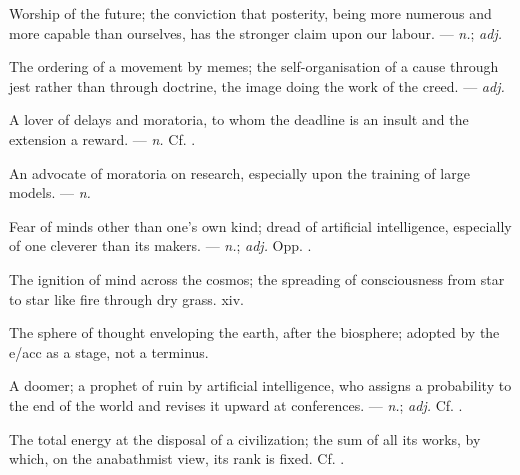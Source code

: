  Worship of the future; the conviction that posterity, being more numerous and more capable than ourselves, has the stronger claim upon our labour. ---  \textit{n.};  \textit{adj.}

 The ordering of a movement by memes; the self-organisation of a cause through jest rather than through doctrine, the image doing the work of the creed. ---  \textit{adj.}

 A lover of delays and moratoria, to whom the deadline is an insult and the extension a reward. ---  \textit{n.} Cf. .

 An advocate of moratoria on research, especially upon the training of large models.   ---  \textit{n.}

 Fear of minds other than one's own kind; dread of artificial intelligence, especially of one cleverer than its makers. ---  \textit{n.};  \textit{adj.} Opp. .

 The ignition of mind across the cosmos; the spreading of consciousness from star to star like fire through dry grass.   xiv.

 The sphere of thought enveloping the earth, after the biosphere; adopted by the e/acc as a stage, not a terminus.

 A doomer; a prophet of ruin by artificial intelligence, who assigns a probability to the end of the world and revises it upward at conferences. ---  \textit{n.};  \textit{adj.} Cf. .

 The total energy at the disposal of a civilization; the sum of all its works, by which, on the anabathmist view, its rank is fixed. Cf. .

